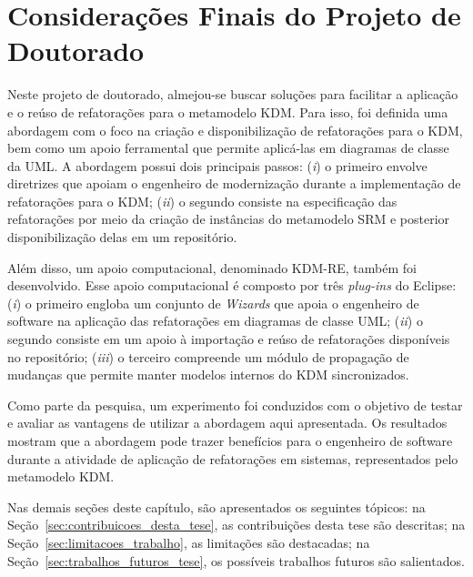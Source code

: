 \section{Considerações Finais do Projeto de Doutorado}
Neste projeto de doutorado, almejou-se buscar soluções para facilitar a aplicação e o reúso de refatorações para o metamodelo KDM. Para isso, foi definida uma abordagem com o foco na criação e disponibilização de refatorações para o KDM, bem como um apoio ferramental que permite aplicá-las em diagramas de classe da UML. A abordagem possui dois principais passos: (\textit{i}) o primeiro envolve diretrizes que apoiam o engenheiro de modernização durante a implementação de refatorações para o KDM; (\textit{ii}) o segundo consiste na especificação das refatorações por meio da criação de instâncias do metamodelo SRM e posterior disponibilização delas em um repositório.

Além disso, um apoio computacional, denominado KDM-RE, também foi desenvolvido. Esse apoio computacional é composto por três \textit{plug-ins} do Eclipse: (\textit{i}) o primeiro engloba um conjunto de \textit{Wizards} que apoia o engenheiro de software na aplicação das refatorações em diagramas de classe UML; (\textit{ii}) o segundo consiste em um apoio à importação e reúso de refatorações disponíveis no repositório; (\textit{iii}) o terceiro compreende um módulo de propagação de mudanças que permite manter modelos internos do KDM sincronizados.

Como parte da pesquisa, um experimento foi conduzidos com o objetivo de testar e avaliar as vantagens de utilizar a abordagem aqui apresentada. Os resultados mostram que a abordagem pode trazer benefícios para o engenheiro de software durante a atividade de aplicação de refatorações em sistemas, representados pelo metamodelo KDM.


Nas demais seções deste capítulo, são apresentados os seguintes tópicos: na Seção~\ref{sec:contribuicoes_desta_tese}, as contribuições desta tese são descritas; na Seção~\ref{sec:limitacoes_trabalho}, as limitações são destacadas; na Seção~\ref{sec:trabalhos_futuros_tese}, os possíveis trabalhos futuros são salientados.%

